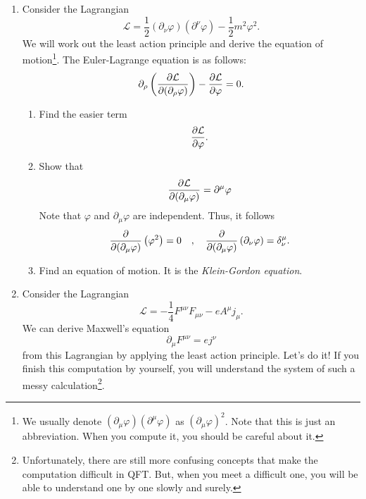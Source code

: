\documentclass[a4paper,pdftex]{article}
\begin{document}
\begin{enumerate}
   \item 
   Consider the Lagrangian
   \begin{equation}
      \mathcal{L}
      =
      \frac{1}{2}
      (\partial_{\nu}\varphi)
      (\partial^{\nu}\varphi)
      -
      \frac{1}{2}m^2\varphi^2
      .
   \end{equation}
   We will work out the least action principle and derive the equation of motion\footnote{
      We usually denote $(\partial_{\mu}\varphi)(\partial^{\mu}\varphi)$ as $(\partial_{\mu}\varphi)^2$. Note that this is just an abbreviation. When you compute it, you should be careful about it.
   }. The Euler-Lagrange equation is as follows:
   \begin{equation}
      \partial_{\rho}
      \left(  
         \pdv{\mathcal{L}}{(\partial_{\rho}\varphi)}
      \right)
      -
      \pdv{\mathcal{L}}{\varphi}
      =
      0
      .
   \end{equation}
   \begin{enumerate}
      \item 
      Find the easier term
      \begin{equation}
         \pdv{\mathcal{L}}{\varphi}
         .
      \end{equation}

      \item 
      Show that 
      \begin{equation}
         \pdv{\mathcal{L}}{(\partial_{\mu}\varphi)}
         =
         \partial^{\mu}\varphi
      \end{equation}
      Note that $\varphi$ and $\partial_{\mu}\varphi$ are independent. Thus, it follows
      \begin{equation}
         \pdv{}{(\partial_{\mu}\varphi)}
         \left(\varphi^2\right)
         =
         0
         \quad
         ,
         \quad
         \pdv{}{(\partial_{\mu}\varphi)}
         \left(\partial_{\nu}\varphi\right)
         =
         \delta^{\mu}_{\nu}
         .
      \end{equation}

      \item 
      Find an equation of motion. It is the \textit{Klein-Gordon equation}.
   \end{enumerate}   

   \item 
   Consider the Lagrangian
   \begin{equation}
      \mathcal{L}
      =
      -
      \frac{1}{4}
      F^{\mu\nu}F_{\mu\nu}
      -
      eA^{\mu}j_{\mu}
      .
   \end{equation}
   We can derive Maxwell's equation
   \begin{equation}
      \partial_{\mu}F^{\mu\nu}
      =
      ej^{\nu}
   \end{equation}
   from this Lagrangian by applying the least action principle. Let's do it! If you finish this computation by yourself, you will understand the system of such a messy calculation\footnote{
      Unfortunately, there are still more confusing concepts that make the computation difficult in QFT. But, when you meet a difficult one, you will be able to understand one by one slowly and surely.
   }.


\end{enumerate}
\end{document}
